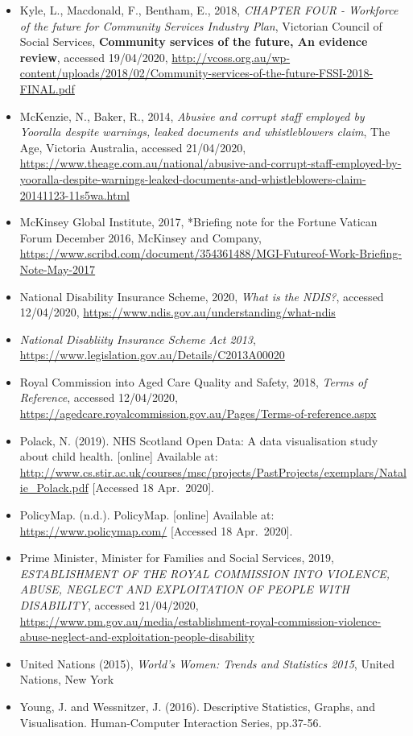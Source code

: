 \documentclass[
  11pt,
]{article}
\begin{document}
\begin{itemize}
\item
  Kyle, L., Macdonald, F., Bentham, E., 2018, \emph{CHAPTER FOUR - Workforce of the future for Community Services Industry Plan}, Victorian Council of Social Services, \textbf{Community services of the future, An evidence review}, accessed 19/04/2020, \url{http://vcoss.org.au/wp-content/uploads/2018/02/Community-services-of-the-future-FSSI-2018-FINAL.pdf}
\item
  McKenzie, N., Baker, R., 2014, \emph{Abusive and corrupt staff employed by Yooralla despite warnings, leaked documents and whistleblowers claim}, The Age, Victoria Australia, accessed 21/04/2020, \url{https://www.theage.com.au/national/abusive-and-corrupt-staff-employed-by-yooralla-despite-warnings-leaked-documents-and-whistleblowers-claim-20141123-11s5wa.html}
\item
  McKinsey Global Institute, 2017, *Briefing note for the Fortune Vatican Forum December 2016, McKinsey and Company, \url{https://www.scribd.com/document/354361488/MGI-Futureof-Work-Briefing-Note-May-2017}
\item
  National Disability Insurance Scheme, 2020, \emph{What is the NDIS?}, accessed 12/04/2020, \url{https://www.ndis.gov.au/understanding/what-ndis}
\item
  \emph{National Disabliity Insurance Scheme Act 2013}, \url{https://www.legislation.gov.au/Details/C2013A00020}
\item
  Royal Commission into Aged Care Quality and Safety, 2018, \emph{Terms of Reference}, accessed 12/04/2020, \url{https://agedcare.royalcommission.gov.au/Pages/Terms-of-reference.aspx}
\item
  Polack, N. (2019). NHS Scotland Open Data: A data visualisation study about child health. {[}online{]} Available at: \url{http://www.cs.stir.ac.uk/courses/msc/projects/PastProjects/exemplars/Natalie_Polack.pdf} {[}Accessed 18 Apr.~2020{]}.
\item
  PolicyMap. (n.d.). PolicyMap. {[}online{]} Available at: \url{https://www.policymap.com/} {[}Accessed 18 Apr.~2020{]}.
\item
  Prime Minister, Minister for Families and Social Services, 2019, \emph{ESTABLISHMENT OF THE ROYAL COMMISSION INTO VIOLENCE, ABUSE, NEGLECT AND EXPLOITATION OF PEOPLE WITH DISABILITY}, accessed 21/04/2020, \url{https://www.pm.gov.au/media/establishment-royal-commission-violence-abuse-neglect-and-exploitation-people-disability}
\item
  United Nations (2015), \emph{World's Women: Trends and Statistics 2015}, United Nations, New York
\item
  Young, J. and Wessnitzer, J. (2016). Descriptive Statistics, Graphs, and Visualisation. Human-Computer Interaction Series, pp.37-56.
\end{itemize}
\end{document}
